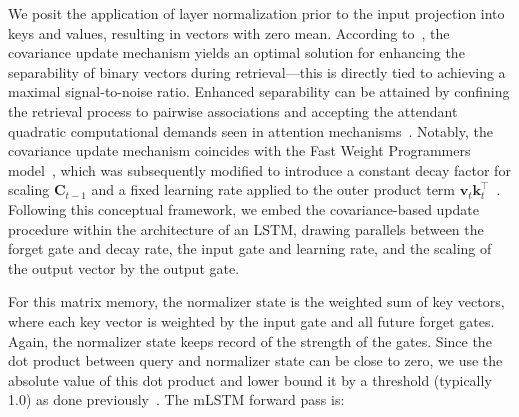 We posit the application of layer normalization prior to the input projection into keys and values, resulting in vectors with zero mean. According to~\citep{Dayan:91}, the covariance update mechanism yields an optimal solution for enhancing the separability of binary vectors during retrieval—this is directly tied to achieving a maximal signal-to-noise ratio. Enhanced separability can be attained by confining the retrieval process to pairwise associations and accepting the attendant quadratic computational demands seen in attention mechanisms~\citep{Krotov:16,Krotov:17,Ramsauer:21}. Notably, the covariance update mechanism coincides with the Fast Weight Programmers model~\citep{Schmidhuber:92ncfastweights,Schlag:21}, which was subsequently modified to introduce a constant decay factor for scaling $\mathbf{C}_{t-1}$ and a fixed learning rate applied to the outer product term $\mathbf{v}_{t} \mathbf{k}_t ^\top$~\citep{Ba:16}. Following this conceptual framework, we embed the covariance-based update procedure within the architecture of an LSTM, drawing parallels between the forget gate and decay rate, the input gate and learning rate, and the scaling of the output vector by the output gate.

For this matrix memory, the normalizer state is the weighted sum of key vectors, where each key vector is weighted by the input gate and all future forget gates. Again, the normalizer state keeps record of the strength of the gates. Since the dot product between query and normalizer state can be close to zero, we use the absolute value of this dot product and lower bound it by a threshold (typically 1.0) as done previously~\citep{Sun:23arxiv}. The mLSTM forward pass is:

